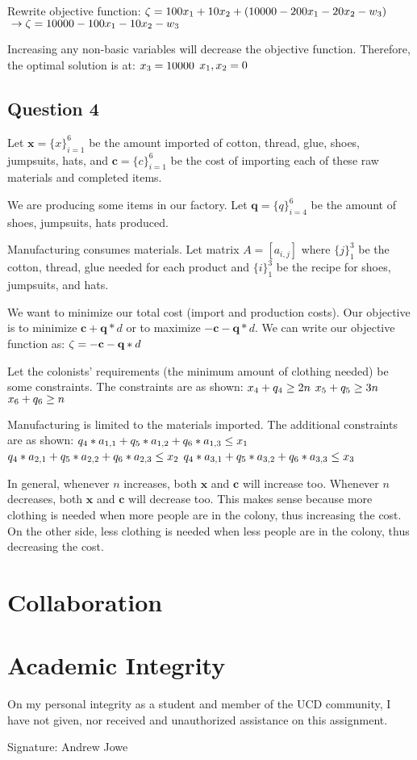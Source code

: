 \documentclass[17pt]{extarticle}
\begin{document}
\bigskip Rewrite objective function:
$\\\zeta = 100x_1 + 10x_2 + (10000 - 200x_1 - 20x_2 - w_3)$
$\\\to \zeta = 10000 - 100x_1 - 10x_2 - w_3$

\bigskip Increasing any non-basic variables will decrease the objective function. Therefore, the optimal solution is at:
$\\ x_3 = 10000$
$\\ x_1, x_2 = 0$

\newpage
\subsection*{Question 4}
Let $\textbf{x} = \{x\}_{i=1}^6$ be the amount imported of cotton, thread, glue, shoes, jumpsuits, hats, and $\textbf{c} = \{c\}_{i=1}^6$ be the cost of importing each of these raw materials and completed items.

\bigskip We are producing some items in our factory. Let $\textbf{q} = \{q\}_{i=4}^6$ be the amount of shoes, jumpsuits, hats produced.

\bigskip Manufacturing consumes materials. Let matrix $A = [a_{i,j}]$ where $\{j\}_1^3$ be the cotton, thread, glue needed for each product and $\{i\}_1^3$ be the recipe for shoes, jumpsuits, and hats.

\bigskip We want to minimize our total cost (import and production costs). Our objective is to minimize $\textbf{c}+\textbf{q}*d$ or to maximize $-\textbf{c}-\textbf{q}*d$. We can write our objective function as:
$\\\zeta = -\textbf{c}-\textbf{q}*d$

\bigskip Let the colonists' requirements (the minimum amount of clothing needed) be some constraints. The constraints are as shown:
$\\x_4 + q_4 \geq 2n$
$\\x_5 + q_5 \geq 3n$
$\\x_6 + q_6 \geq n$

\bigskip Manufacturing is limited to the materials imported. The additional constraints are as shown:
$\\q_4*a_{1,1} + q_5*a_{1,2} + q_6*a_{1,3} \leq x_1$
$\\q_4*a_{2,1} + q_5*a_{2,2} + q_6*a_{2,3} \leq x_2$
$\\q_4*a_{3,1} + q_5*a_{3,2} + q_6*a_{3,3} \leq x_3$

\bigskip In general, whenever $n$ increases, both $\textbf{x}$ and $\textbf{c}$ will increase too. Whenever $n$ decreases, both $\textbf{x}$ and $\textbf{c}$ will decrease too. This makes sense because more clothing is needed when more people are in the colony, thus increasing the cost. On the other side, less clothing is needed when less people are in the colony, thus decreasing the cost.

\newpage
\section*{Collaboration}

\newpage
\section*{Academic Integrity}
On my personal integrity as a student and member of the UCD community, I have not given, nor received and unauthorized assistance on this assignment.

Signature: Andrew Jowe
\end{document}
